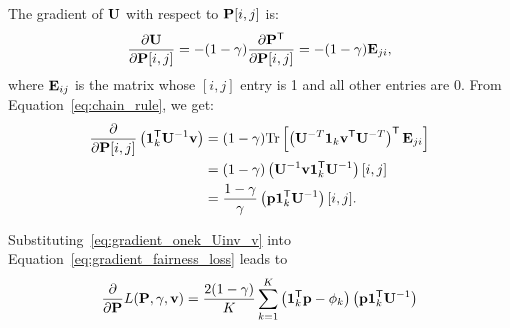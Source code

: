 The gradient of $\mathbf{{U}}$ with respect to $\mathbf{{P}}[i, j]$ is:
\begin{equation*}
    \frac{\partial \mathbf{{U}}}{\partial \mathbf{{P}}[i, j]} 
        = - (1 - \gamma) \frac{\partial \mathbf{{P}}^{\mathsf{T}}}{\partial \mathbf{{P}}[i, j]} = - (1 - \gamma) \mathbf{{E}}_{ji},
\end{equation*}
where $\mathbf{{E}}_{ij}$ is the matrix whose $[i,j]$ entry is 1 and all other entries are 0.
From Equation~\eqref{eq:chain_rule}, we get:
\begin{equation*}
\label{eq:gradient_onek_Uinv_v}
\begin{aligned}
\frac{\partial}{\partial \mathbf{{P}}[i, j]} \left(\mathbf{{1}}_{k}^{\mathsf{T}} \mathbf{{U}}^{-1} \mathbf{{v}}\right) 
    & = (1 - \gamma) \mathrm{Tr} 
            \left[ \left( \mathbf{{U}}^{-T} \mathbf{{1}}_{k} \mathbf{{v}}^{\mathsf{T}} \mathbf{{U}}^{-T} \right)^{\mathsf{T}} \mathbf{{E}}_{ji} \right] \\ 
    & = (1 - \gamma) \left( \mathbf{{U}}^{-1} \mathbf{{v}} \mathbf{{1}}_{k}^{\mathsf{T}} \mathbf{{U}}^{-1} \right)[i, j] \\
    & = \frac{1 - \gamma}{\gamma} \left( \mathbf{{p}} \mathbf{{1}}_{k}^{\mathsf{T}} \mathbf{{U}}^{-1} \right)[i, j].
\end{aligned}
\end{equation*}

Substituting~\eqref{eq:gradient_onek_Uinv_v} into Equation~\eqref{eq:gradient_fairness_loss} 
leads to 
\begin{equation}
\begin{aligned}
\label{eq:gradient_fairness_loss_final}
    \frac{\partial}{\partial \mathbf{{P}}} L(\mathbf{{P}}, \gamma, \mathbf{{v}}) 
         = \frac{2 (1-\gamma)}{K} \sum_{k=1}^{K} \left(\mathbf{{1}}_{k}^{\mathsf{T}} \mathbf{{p}} - \phi_k\right) \left( \mathbf{{p}} \mathbf{{1}}_{k}^{\mathsf{T}} \mathbf{{U}}^{-1} \right)           
\end{aligned}
\end{equation}

